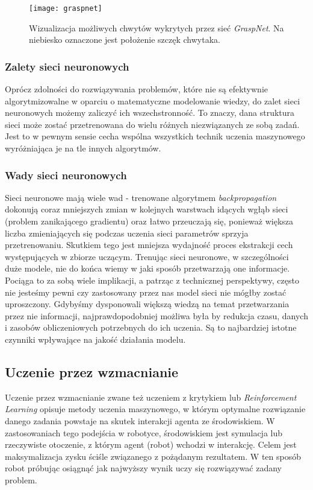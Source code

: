 \documentclass{article}
\begin{document}
\begin{figure}[h]
\centering
\texttt{[image: graspnet]}
\caption{Wizualizacja możliwych chwytów wykrytych przez sieć \emph{GraspNet}. Na niebiesko oznaczone jest położenie szczęk chwytaka.}
\end{figure}

\subsubsection*{\Large{Zalety sieci neuronowych}}
Oprócz zdolności do rozwiązywania problemów, które nie są efektywnie algorytmizowalne w oparciu o matematyczne modelowanie wiedzy, do zalet sieci neuronowych możemy zaliczyć ich wszechstronność. To znaczy, dana struktura sieci może zostać przetrenowana do wielu różnych niezwiązanych ze sobą zadań. Jest to w pewnym sensie cecha wspólna wszystkich technik uczenia maszynowego wyróżniająca je na tle innych algorytmów.

\subsubsection*{\Large{Wady sieci neuronowych}}
Sieci neuronowe mają wiele wad - trenowane algorytmem \emph{backpropagation} dokonują coraz mniejszych zmian w kolejnych warstwach idących wgłąb sieci (problem zanikającego gradientu) oraz łatwo przeuczają się, ponieważ większa liczba zmieniających się podczas uczenia sieci parametrów sprzyja przetrenowaniu. Skutkiem tego jest mniejsza wydajność proces ekstrakcji cech występujących w zbiorze uczącym. Trenując sieci neuronowe, w szczególności duże modele, nie do końca wiemy w jaki sposób przetwarzają one informacje. Pociąga to za sobą wiele implikacji, a patrząc z technicznej perspektywy, często nie jesteśmy pewni czy zastosowany przez nas model sieci nie mógłby zostać uproszczony. Gdybyśmy dysponowali większą wiedzą na temat przetwarzania przez nie informacji, najprawdopodobniej możliwa była by redukcja czasu, danych i zasobów obliczeniowych potrzebnych do ich uczenia. Są to najbardziej istotne czynniki wpływające na jakość działania modelu.

\subsection*{\LARGE{Uczenie przez wzmacnianie}} 

Uczenie przez wzmacnianie zwane też uczeniem z krytykiem lub \emph{Reinforcement Learning} opisuje metody uczenia maszynowego, w którym optymalne rozwiązanie danego zadania powstaje na skutek interakcji agenta ze środowiskiem. W zastosowaniach tego podejścia w robotyce, środowiskiem jest symulacja lub rzeczywiste otoczenie, z którym agent (robot) wchodzi w interakcję. Celem jest maksymalizacja zysku ściśle związanego z pożądanym rezultatem. W ten sposób robot próbując osiągnąć jak najwyższy wynik uczy się rozwiązywać zadany problem.
\end{document}
